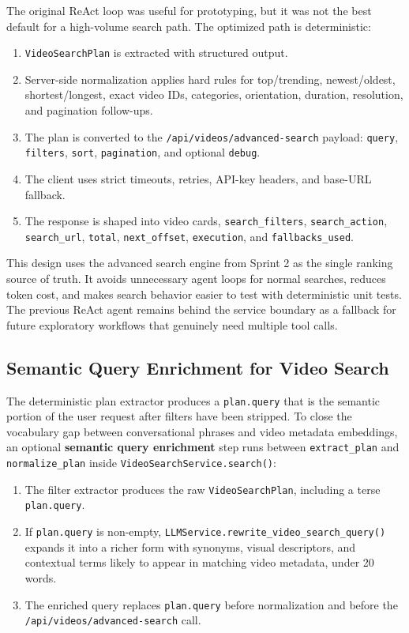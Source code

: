 The original ReAct loop was useful for prototyping, but it was not the best default for a
high-volume search path. The optimized path is deterministic:

\begin{enumerate}
  \item \texttt{VideoSearchPlan} is extracted with structured output.
  \item Server-side normalization applies hard rules for top/trending, newest/oldest,
    shortest/longest, exact video IDs, categories, orientation, duration, resolution, and
    pagination follow-ups.
  \item The plan is converted to the \texttt{/api/videos/advanced-search} payload:
    \texttt{query}, \texttt{filters}, \texttt{sort}, \texttt{pagination}, and optional
    \texttt{debug}.
  \item The client uses strict timeouts, retries, API-key headers, and base-URL fallback.
  \item The response is shaped into video cards, \texttt{search\_filters},
    \texttt{search\_action}, \texttt{search\_url}, \texttt{total}, \texttt{next\_offset},
    \texttt{execution}, and \texttt{fallbacks\_used}.
\end{enumerate}

This design uses the advanced search engine from Sprint 2 as the single ranking source of truth.
It avoids unnecessary agent loops for normal searches, reduces token cost, and makes search
behavior easier to test with deterministic unit tests. The previous ReAct agent remains behind the
service boundary as a fallback for future exploratory workflows that genuinely need multiple tool
calls.

\subsection{Semantic Query Enrichment for Video Search}

The deterministic plan extractor produces a \texttt{plan.query} that is the semantic portion of
the user request after filters have been stripped. To close the vocabulary gap between
conversational phrases and video metadata embeddings, an optional \textbf{semantic query
enrichment} step runs between \texttt{extract\_plan} and \texttt{normalize\_plan} inside
\texttt{VideoSearchService.search()}:

\begin{enumerate}
  \item The filter extractor produces the raw \texttt{VideoSearchPlan}, including a terse
    \texttt{plan.query}.
  \item If \texttt{plan.query} is non-empty, \texttt{LLMService.rewrite\_video\_search\_query()}
    expands it into a richer form with synonyms, visual descriptors, and contextual terms
    likely to appear in matching video metadata, under 20 words.
  \item The enriched query replaces \texttt{plan.query} before normalization and before the
    \texttt{/api/videos/advanced-search} call.
\end{enumerate}

